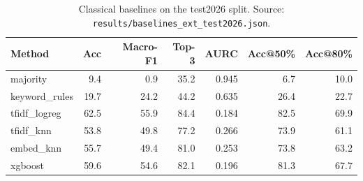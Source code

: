 \begin{table}[t]\centering
\small
\caption{Classical baselines on the test2026 split. Source: \texttt{results/baselines\_ext\_test2026.json}.}
\label{tab:baselines-test2026}
\begin{tabular}{lrrrrrr}
\toprule
Method & Acc & Macro-F1 & Top-3 & AURC & Acc@50\% & Acc@80\% \\
\midrule
majority & 9.4 & 0.9 & 35.2 & 0.945 & 6.7 & 10.0 \\
keyword\_rules & 19.7 & 24.2 & 44.2 & 0.635 & 26.4 & 22.7 \\
tfidf\_logreg & 62.5 & 55.9 & 84.4 & 0.184 & 82.5 & 69.9 \\
tfidf\_knn & 53.8 & 49.8 & 77.2 & 0.266 & 73.9 & 61.1 \\
embed\_knn & 55.7 & 49.4 & 81.0 & 0.253 & 73.8 & 63.2 \\
xgboost & 59.6 & 54.6 & 82.1 & 0.196 & 81.3 & 67.7 \\
\bottomrule
\end{tabular}
\end{table}
